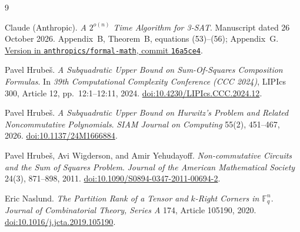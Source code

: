\documentclass[11pt,a4paper]{article}
\begin{document}
\begin{thebibliography}{9}
\setlength{\itemsep}{0.35em}

Claude (Anthropic).
\emph{A \(2^{o(n)}\) Time Algorithm for 3-SAT}.
Manuscript dated 26 October 2026.
Appendix~B, Theorem~B, equations (53)--(56); Appendix~G.
\href{https://github.com/anthropics/formal-math/blob/16a5ce41304fcdaea4e0be7c132e1c361dc26da5/eth/paper.pdf}
{Version in \texttt{anthropics/formal-math}, commit \texttt{16a5ce4}}.

Pavel Hrube\v{s}.
\emph{A Subquadratic Upper Bound on Sum-Of-Squares Composition Formulas}.
In \emph{39th Computational Complexity Conference (CCC 2024)},
LIPIcs 300, Article 12, pp.~12:1--12:11, 2024.
\href{https://doi.org/10.4230/LIPIcs.CCC.2024.12}
{doi:10.4230/LIPIcs.CCC.2024.12}.

Pavel Hrube\v{s}.
\emph{A Subquadratic Upper Bound on Hurwitz's Problem and Related
Noncommutative Polynomials}.
\emph{SIAM Journal on Computing} 55(2), 451--467, 2026.
\href{https://doi.org/10.1137/24M1666884}{doi:10.1137/24M1666884}.

Pavel Hrube\v{s}, Avi Wigderson, and Amir Yehudayoff.
\emph{Non-commutative Circuits and the Sum of Squares Problem}.
\emph{Journal of the American Mathematical Society} 24(3), 871--898, 2011.
\href{https://doi.org/10.1090/S0894-0347-2011-00694-2}
{doi:10.1090/S0894-0347-2011-00694-2}.

Eric Naslund.
\emph{The Partition Rank of a Tensor and \(k\)-Right Corners in
\(\mathbb F_q^n\)}.
\emph{Journal of Combinatorial Theory, Series A} 174, Article 105190, 2020.
\href{https://doi.org/10.1016/j.jcta.2019.105190}
{doi:10.1016/j.jcta.2019.105190}.

\end{thebibliography}
\end{document}
